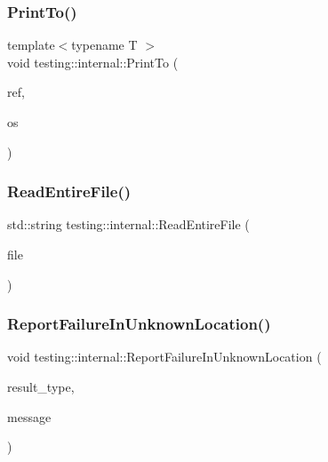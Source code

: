 \mbox{\label{namespacetesting_1_1internal_a8fd10cc30084c36a89c74868c8bd53f8}} 
\subsubsection{\texorpdfstring{PrintTo()}{PrintTo()}\hspace{0.1cm}{\footnotesize\ttfamily [20/20]}}
{\footnotesize\ttfamily template$<$typename T $>$ \\
void testing\+::internal\+::\+Print\+To (\begin{DoxyParamCaption}\item[{const \mbox{\hyperlink{classtesting_1_1internal_1_1ReferenceWrapper}{Reference\+Wrapper}}$<$ T $>$ \&}]{ref,  }\item[{\+::std\+::ostream $\ast$}]{os }\end{DoxyParamCaption})}

\mbox{\label{namespacetesting_1_1internal_a2cc0be60c54a8701423fe5297e1349ee}} 
\subsubsection{\texorpdfstring{ReadEntireFile()}{ReadEntireFile()}}
{\footnotesize\ttfamily std\+::string testing\+::internal\+::\+Read\+Entire\+File (\begin{DoxyParamCaption}\item[{F\+I\+LE $\ast$}]{file }\end{DoxyParamCaption})}

\mbox{\label{namespacetesting_1_1internal_a85f6ff0e40f9a5f10af66a73cf1364fa}} 
\subsubsection{\texorpdfstring{ReportFailureInUnknownLocation()}{ReportFailureInUnknownLocation()}}
{\footnotesize\ttfamily void testing\+::internal\+::\+Report\+Failure\+In\+Unknown\+Location (\begin{DoxyParamCaption}\item[{Test\+Part\+Result\+::\+Type}]{result\+\_\+type,  }\item[{const std\+::string \&}]{message }\end{DoxyParamCaption})}

